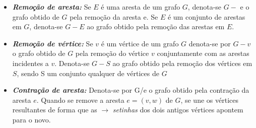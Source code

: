 \documentclass[12pt]{article}
\begin{document}
\begin{itemize}
	\item \textbf{\textit{Remoção de aresta:}}
	      Se $E$ é uma aresta de um grafo $G$, denota-se $G-$ e o grafo obtido de $G$ pela remoção da aresta e.
	      Se $E$ é um conjunto de arestas em $G$, denota-se $G-E$ ao grafo obtido pela remoção das arestas em $E$.
	\item \textbf{\textit{Remoção de vértice:}}
	      Se $v$ é um vértice de um grafo $G$ denota-se por $G - v$ o grafo obtido de $G$ pela remoção do vértice $v$ conjuntamente com as arestas incidentes a $v$.
	      Denota-se $G - S$ ao grafo obtido pela remoção dos vértices em $S$,
	      sendo S um conjunto qualquer de vértices de $G$
	\item \textbf{\textit{Contração de aresta:}} Denota-se por G/e o grafo obtido pela contração da aresta $e$.
	Quando se remove a aresta $e = (v, w)$ de $G$, se une os vértices resultantes de forma que as $\longrightarrow$ \textit{setinhas} dos dois antigos vértices apontem para o novo.
\end{itemize}
\end{document}
